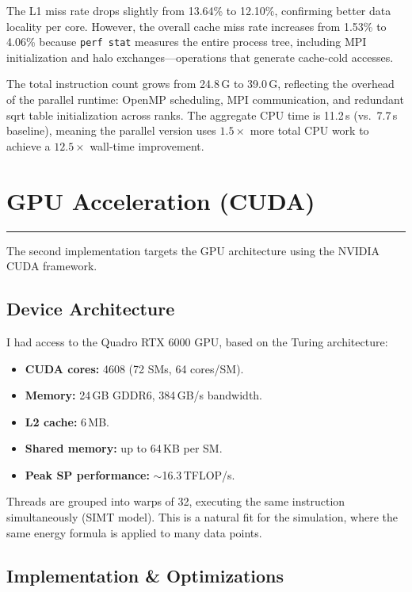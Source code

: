 \documentclass[10pt,dvipsnames,table,twocolumn]{article}
\newcommand{\sectionrule}{\vspace{0.2em}\noindent\textcolor{PaleInk}{\rule{\columnwidth}{0.4pt}}\vspace{0.3em}}
\let\oldsection\section
\renewcommand{\section}[1]{\oldsection{#1}\sectionrule}
\let\oldtexttt\texttt
\renewcommand{\texttt}[1]{%
  {\small\colorbox{Mist}{\oldtexttt{\textcolor{DarkInk}{#1}}}}%
}
\begin{document}
The L1 miss rate drops slightly from 13.64\% to 12.10\%, confirming better data locality per core. However, the overall cache miss rate increases from 1.53\% to 4.06\% because \texttt{perf~stat} measures the entire process tree, including MPI initialization and halo exchanges---operations that generate cache-cold accesses.

The total instruction count grows from 24.8\,G to 39.0\,G, reflecting the overhead of the parallel runtime: OpenMP scheduling, MPI communication, and redundant sqrt table initialization across ranks. The aggregate CPU time is 11.2\,s (vs.\ 7.7\,s baseline), meaning the parallel version uses $1.5\times$ more total CPU work to achieve a $12.5\times$ wall-time improvement.


\section{GPU Acceleration (CUDA)}\label{sec:cuda}

The second implementation targets the GPU architecture using the NVIDIA CUDA framework.

\subsection{Device Architecture}

I had access to the Quadro RTX 6000 GPU, based on the Turing architecture:

\begin{itemize}
  \item \textbf{CUDA cores:} 4608 (72 SMs, 64 cores/SM).
  \item \textbf{Memory:} 24\,GB GDDR6, 384\,GB/s bandwidth.
  \item \textbf{L2 cache:} 6\,MB.
  \item \textbf{Shared memory:} up to 64\,KB per SM.
  \item \textbf{Peak SP performance:} $\sim$16.3\,TFLOP/s.
\end{itemize}

Threads are grouped into warps of 32, executing the same instruction simultaneously (SIMT model). This is a natural fit for the simulation, where the same energy formula is applied to many data points.

\subsection{Implementation \& Optimizations}
\end{document}

